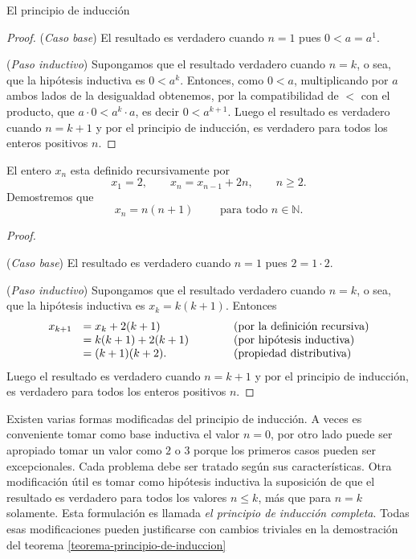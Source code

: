 \begin{section}{El principio de inducción}
\begin{proof}
\noindent (\textit{Caso  base}) El resultado es verdadero
cuando $n=1$ pues $ 0 < a=a^1$.

\noindent (\textit{Paso  inductivo})
 Supongamos que el resultado verdadero cuando $n=k$, o sea, que la hipótesis inductiva es $0 < a^k$. Entonces, como $0<a$, multiplicando por $a$ ambos lados de la desigualdad obtenemos, por la compatibilidad de $<$ con el producto, que $a\cdot 0 < a^k \cdot a$, es decir $0<a^{k+1}$.  Luego el resultado es verdadero cuando $n=k+1$ y por el principio de inducción, es verdadero para todos los enteros positivos $n$.
\end{proof}

\begin{ejemplo*} El entero $x_n$ esta definido recursivamente por
$$
x_1=2, \qquad x_n=x_{n-1} +2n, \qquad n\ge 2.
$$
Demostremos que
$$
x_n = n(n+1) \qquad \text{ para todo } n\in \mathbb N.
$$
\end{ejemplo*}
\begin{proof}
\    

\noindent(\textit{Caso  base}) El resultado es verdadero cuando $n=1$ pues $ 2 = 1 \cdot 2$.

\noindent (\textit{Paso  inductivo})
 Supongamos que el resultado verdadero cuando $n=k$, o sea, que la hipótesis inductiva es $x_k = k(k+1)$. Entonces
$$
\begin{matrix*}[l]
x_{k+1} &= x_k + 2(k+1) \hfill &\qquad &\text{(por la definición recursiva)} \hfill \\
&= k(k+1)+2(k+1) \hfill &\qquad &\text{(por hipótesis inductiva)}\hfill \\
&= (k+1)(k+2). \hfill  &\qquad &\text{(propiedad distributiva)}\hfill
\end{matrix*}
$$
Luego el resultado es verdadero cuando $n=k+1$ y por el principio de inducción, es verdadero para todos los enteros positivos $n$.
\end{proof}


Existen varias formas modificadas del principio de inducción. A veces es conveniente tomar como base inductiva el valor $n=0$, por otro lado puede ser apropiado tomar un valor como $2$ o $3$ porque los primeros casos pueden ser excepcionales. Cada problema debe ser tratado según sus características. Otra modificación útil es tomar como hipótesis inductiva la suposición de que el resultado es verdadero para todos los valores $n\le k$, más que para $n=k$ solamente. Esta formulación es llamada \textit{el principio de inducción completa}. Todas esas modificaciones pueden justificarse con cambios triviales en la demostración del teorema \ref{teorema-principio-de-induccion}


\end{section}
